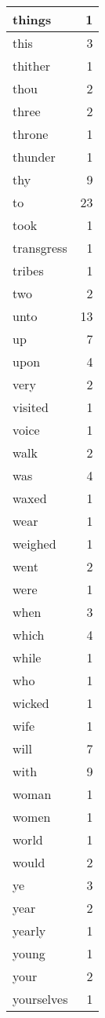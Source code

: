 \begin{center}
\begin{longtable}{l|r}
things & 1 \\ \hline
this & 3 \\ \hline
thither & 1 \\ \hline
thou & 2 \\ \hline
three & 2 \\ \hline
throne & 1 \\ \hline
thunder & 1 \\ \hline
thy & 9 \\ \hline
to & 23 \\ \hline
took & 1 \\ \hline
transgress & 1 \\ \hline
tribes & 1 \\ \hline
two & 2 \\ \hline
unto & 13 \\ \hline
up & 7 \\ \hline
upon & 4 \\ \hline
very & 2 \\ \hline
visited & 1 \\ \hline
voice & 1 \\ \hline
walk & 2 \\ \hline
was & 4 \\ \hline
waxed & 1 \\ \hline
wear & 1 \\ \hline
weighed & 1 \\ \hline
went & 2 \\ \hline
were & 1 \\ \hline
when & 3 \\ \hline
which & 4 \\ \hline
while & 1 \\ \hline
who & 1 \\ \hline
wicked & 1 \\ \hline
wife & 1 \\ \hline
will & 7 \\ \hline
with & 9 \\ \hline
woman & 1 \\ \hline
women & 1 \\ \hline
world & 1 \\ \hline
would & 2 \\ \hline
ye & 3 \\ \hline
year & 2 \\ \hline
yearly & 1 \\ \hline
young & 1 \\ \hline
your & 2 \\ \hline
yourselves & 1 \\ \hline
\end{longtable}
\end{center}



